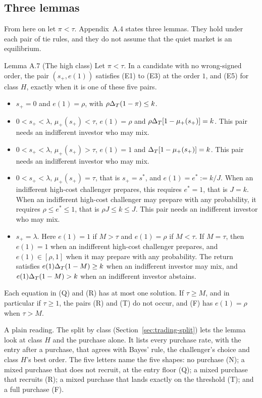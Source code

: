 \subsection{Three lemmas}

From here on let \(\pi<\tau\). Appendix~A.4 states three lemmas. They hold under each pair of tie rules, and they do
not assume that the quiet market is an equilibrium.

\begin{paperresult}{Lemma A.7 (The high class)}
Let \(\pi<\tau\). In a candidate with no wrong-signed order, the pair \((s_+,e(1))\) satisfies (E1) to (E3) at the
order \(1\), and (E5) for class \(H\), exactly when it is one of these five pairs.
\begin{itemize}[leftmargin=2.5em]
\item[(N)] \(s_+=0\) and \(e(1)=\rho\), with \(\rho\Delta_T(1-\pi)\le k\).
\item[(Q)] \(0<s_+<\lambda\), \(\mu_+(s_+)<\tau\), \(e(1)=\rho\) and \(\rho\Delta_T[1-\mu_+(s_+)]=k\). This pair needs an
indifferent investor who may mix.
\item[(R)] \(0<s_+<\lambda\), \(\mu_+(s_+)>\tau\), \(e(1)=1\) and \(\Delta_T[1-\mu_+(s_+)]=k\). This pair needs an
indifferent investor who may mix.
\item[(T)] \(0<s_+<\lambda\), \(\mu_+(s_+)=\tau\), that is \(s_+=s^*\), and \(e(1)=e^*:=k/J\). When an indifferent
high-cost challenger prepares, this requires \(e^*=1\), that is \(J=k\). When an indifferent high-cost challenger may
prepare with any probability, it requires \(\rho\le e^*\le1\), that is \(\rho J\le k\le J\). This pair needs an
indifferent investor who may mix.
\item[(F)] \(s_+=\lambda\). Here \(e(1)=1\) if \(M>\tau\) and \(e(1)=\rho\) if \(M<\tau\). If \(M=\tau\), then
\(e(1)=1\) when an indifferent high-cost challenger prepares, and \(e(1)\in[\rho,1]\) when it may prepare with any
probability. The return satisfies \(e(1)\Delta_T(1-M)\ge k\) when an indifferent investor may mix, and
\(e(1)\Delta_T(1-M)>k\) when an indifferent investor abstains.
\end{itemize}
Each equation in (Q) and (R) has at most one solution. If \(\tau\ge M\), and in particular if \(\tau\ge1\), the pairs
(R) and (T) do not occur, and (F) has \(e(1)=\rho\) when \(\tau>M\).
\end{paperresult}

A plain reading. The split by class (Section~\ref{sec:trading-split}) lets the lemma look at class \(H\) and the
purchase alone. It lists every purchase rate, with the entry after a purchase, that agrees with Bayes' rule, the
challenger's choice and class \(H\)'s best order. The five letters name the five shapes: no purchase (N); a mixed
purchase that does not recruit, at the entry floor (Q); a mixed purchase that recruits (R); a mixed purchase that
lands exactly on the threshold (T); and a full purchase (F).

